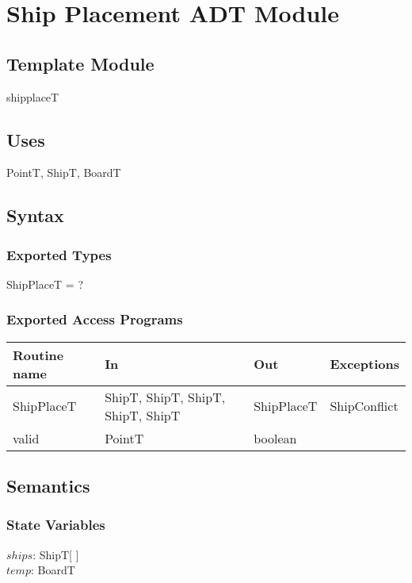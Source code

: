 \documentclass[12pt]{article}
\begin{document}
\newpage
\section* {Ship Placement ADT Module}

\subsection* {Template Module}

shipplaceT

\subsection* {Uses}

PointT, ShipT, BoardT

\subsection* {Syntax}

\subsubsection* {Exported Types}

ShipPlaceT = ?

\subsubsection* {Exported Access Programs}

\begin{tabular}{| l | l | l | l |}
\hline
\textbf{Routine name} & \textbf{In} & \textbf{Out} & \textbf{Exceptions}\\
\hline
ShipPlaceT & ShipT, ShipT, ShipT, ShipT, ShipT & ShipPlaceT & ShipConflict\\
\hline 
valid & PointT & boolean &\\
\hline 
\end{tabular}

\subsection* {Semantics}

\subsubsection* {State Variables}

$\mathit{ships}$: ShipT[ ] \\
$\mathit{temp}$: BoardT \\
\end{document}
